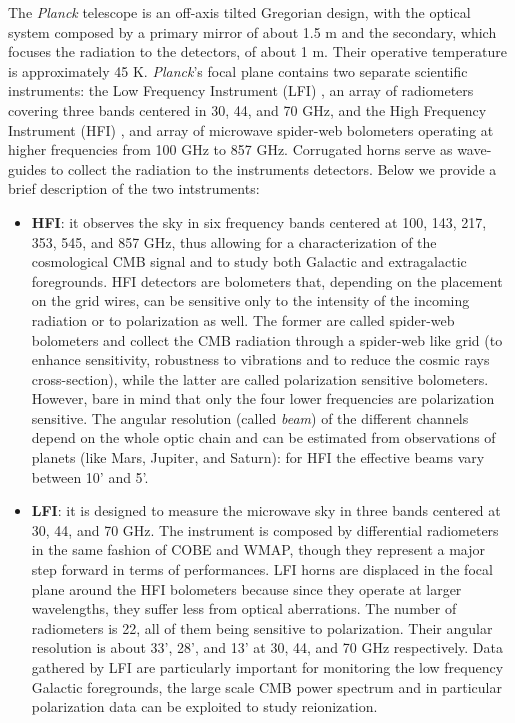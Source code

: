 The \textit{Planck} telescope is an off-axis tilted Gregorian design, with the optical system composed by a primary mirror of about 1.5 m and the secondary, which focuses the radiation to the detectors, of about 1 m. Their operative temperature is approximately 45 K. \textit{Planck}'s focal plane contains two separate scientific instruments: the Low Frequency Instrument (LFI) \citep{Bersanelli2010}, an array of radiometers covering three bands centered in 30, 44, and 70 GHz, and the High Frequency Instrument (HFI) \citep{Lamarre2010}, and array of microwave spider-web bolometers operating at higher frequencies from 100 GHz to 857 GHz. Corrugated horns serve as wave-guides to collect the radiation to the instruments detectors. Below we provide a brief description of the two intstruments:
%
\begin{itemize}
\item{\textbf{HFI}: it observes the sky in six frequency bands centered at 100, 143, 217, 353, 545, and 857 GHz, thus allowing for a characterization of the cosmological \gls{CMB} signal and to study both Galactic and extragalactic foregrounds. HFI detectors are bolometers that, depending on the placement on the grid wires, can be sensitive only to the intensity of the incoming radiation or to polarization as well. The former are called spider-web bolometers and collect the \gls{CMB} radiation through a spider-web like grid (to enhance sensitivity, robustness to vibrations and to reduce the cosmic rays cross-section), while the latter are called polarization sensitive bolometers. However, bare in mind that only the four lower frequencies are polarization sensitive. The angular resolution (called \emph{beam}) of the different channels depend on the whole optic chain and can be estimated from observations of planets (like Mars, Jupiter, and Saturn): for HFI the effective beams vary between 10' and 5'.}
\item{\textbf{LFI}: it is designed to measure the microwave sky in three bands centered at 30, 44, and 70 GHz. The instrument is composed by differential radiometers in the same fashion of COBE and WMAP, though they represent a major step forward in terms of performances. LFI horns are displaced in the focal plane around the HFI bolometers because since they operate at larger wavelengths, they suffer less from optical aberrations. The number of radiometers is 22, all of them being sensitive to polarization. Their angular resolution is about 33', 28', and 13' at 30, 44, and 70 GHz respectively. Data gathered by LFI are particularly important for monitoring the low frequency Galactic foregrounds, the large scale \gls{CMB} power spectrum and in particular polarization data can be exploited to study reionization.}
\end{itemize}
